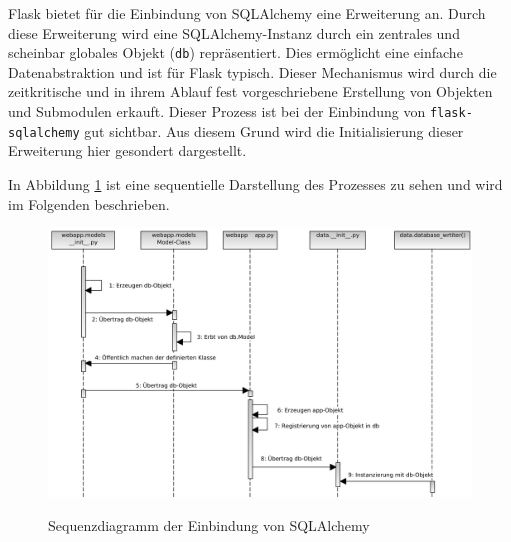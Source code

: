 Flask bietet für die Einbindung von SQLAlchemy eine Erweiterung an. 
Durch diese Erweiterung wird eine SQLAlchemy-Instanz durch ein zentrales und scheinbar globales Objekt (\texttt{db}) repräsentiert. Dies ermöglicht eine einfache Datenabstraktion und ist für Flask typisch. Dieser Mechanismus wird durch die zeitkritische und in ihrem Ablauf fest vorgeschriebene Erstellung von Objekten und Submodulen erkauft.
Dieser Prozess ist bei der Einbindung von \texttt{flask-sqlalchemy} gut sichtbar. Aus diesem Grund wird die Initialisierung dieser Erweiterung hier gesondert dargestellt.

In Abbildung \ref{fig:sequenzSQLALCHEMY} ist eine sequentielle Darstellung des Prozesses zu sehen und wird im Folgenden beschrieben. 

\begin{figure}[H]
 \centering
 \includegraphics[width=\textwidth]{pix/seq_db.png}
 \label{fig:sequenzSQLALCHEMY}
 \caption{Sequenzdiagramm der Einbindung von SQLAlchemy}
\end{figure}


